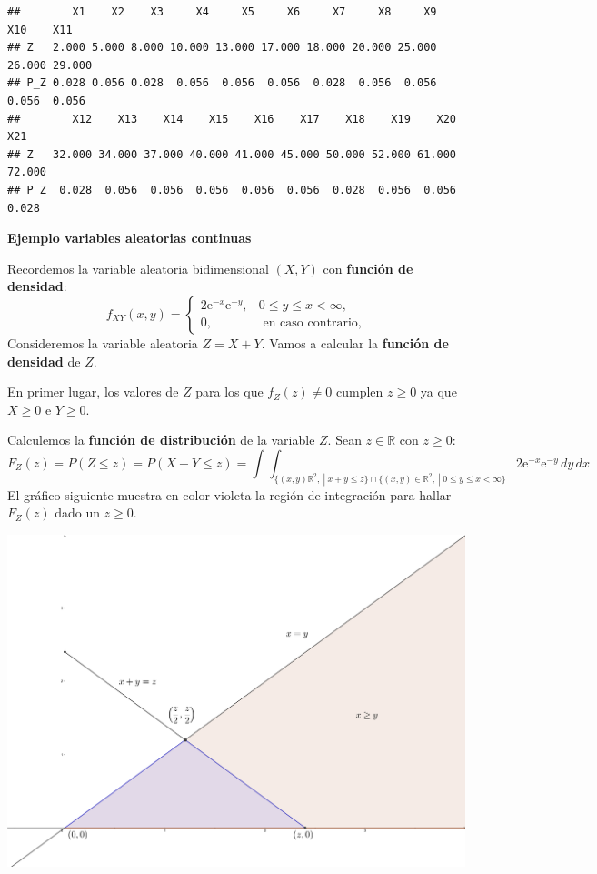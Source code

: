 \documentclass[]{book}
\begin{document}
\begin{verbatim}
##        X1    X2    X3     X4     X5     X6     X7     X8     X9    X10    X11
## Z   2.000 5.000 8.000 10.000 13.000 17.000 18.000 20.000 25.000 26.000 29.000
## P_Z 0.028 0.056 0.028  0.056  0.056  0.056  0.028  0.056  0.056  0.056  0.056
##        X12    X13    X14    X15    X16    X17    X18    X19    X20    X21
## Z   32.000 34.000 37.000 40.000 41.000 45.000 50.000 52.000 61.000 72.000
## P_Z  0.028  0.056  0.056  0.056  0.056  0.056  0.028  0.056  0.056  0.028
\end{verbatim}

\textbf{Ejemplo variables aleatorias continuas}

Recordemos la variable aleatoria bidimensional \((X,Y)\) con \textbf{función de densidad}:
\[
f_{XY}(x,y)=\begin{cases}
2 \mathrm{e}^{-x}\mathrm{e}^{-y}, & 0\leq y\leq x < \infty,\\
0, & \mbox{ en caso contrario,}
\end{cases}
\]
Consideremos la variable aleatoria \(Z=X+Y\). Vamos a calcular la \textbf{función de densidad} de \(Z\).

En primer lugar, los valores de \(Z\) para los que \(f_Z(z)\neq 0\) cumplen \(z\geq 0\) ya que \(X\geq 0\) e \(Y\geq 0\).

Calculemos la \textbf{función de distribución} de la variable \(Z\). Sean \(z\in\mathbb{R}\) con \(z\geq 0\):
\[
F_Z(z)=P(Z\leq z)=P(X+Y\leq z)=\int\int_{\{(x,y)\mathbb{R}^2,\ |\ x+y\leq z\}\cap \{(x,y)\in \mathbb{R}^2,\ |\ 0\leq y\leq x<\infty\}} 2 \mathrm{e}^{-x}\mathrm{e}^{-y}\, dy\, dx
\]
El gráfico siguiente muestra en color violeta la región de integración para hallar \(F_Z(z)\) dado un \(z\geq 0\).

\includegraphics{Images/EjSumaXY.png}
\end{document}
